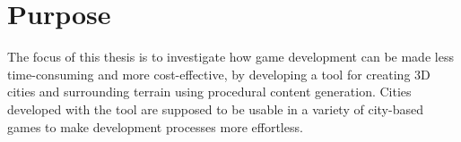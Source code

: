 \section{Purpose}
The focus of this thesis is to investigate how game development can be made less time-consuming and more cost-effective, by developing a tool for creating 3D cities and surrounding terrain using procedural content generation. Cities developed with the tool are supposed to be usable in a variety of city-based games to make development processes more effortless.

\begin{comment}
The focus of this theses is on the algorithms for Procedural Content Generation; more specifically, a tool for automating the creation of realistic cities to make game development cost-effective and less time-consuming.
\end{comment}
